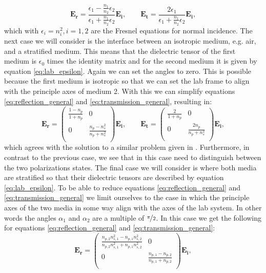 \begin{equation}
    \bm{E_r} = \frac{\epsilon_1-\frac{n_1}{n_2}\epsilon_2}{\epsilon_1+\frac{n_1}{n_2}\epsilon_2}\bm{E_i}, \qquad \bm{E_t} = \frac{2\epsilon_1}{\epsilon_1+\frac{n_1}{n_2}\epsilon_2}\bm{E_i},
\end{equation}
which with $\epsilon_i=n_i^2, i=1,2$ are the Fresnel equations for normal incidence. The next case we will consider is the interface between an isotropic medium, e.g. air, and a stratified medium. This means that the dielectric tensor of the first medium is $\epsilon_0$ times the identity matrix and for the second medium it is given by equation \ref{eq:lab_epsilon}. Again we can set the angles to zero. This is possible because the first medium is isotropic so that we can set the lab frame to align with the principle axes of medium 2. With this we can simplify equations \ref{eq:reflection_general} and \ref{eq:transmission_general}, resulting in:
\begin{equation}
    \bm{E_r} =
    \begin{pmatrix}
        \frac{1-n_p}{1+n_p} & 0 \\
        0 & \frac{n_p-n_s^2}{n_p+n_s^2} \\
    \end{pmatrix}
    \bm{E_i}, \qquad
    \bm{E_t} =
    \begin{pmatrix}
        \frac{2}{1+n_p} & 0 \\
        0 & \frac{2n_p}{n_p+n_s^2} \\
    \end{pmatrix}
    \bm{E_i},
\end{equation}
which agrees with the solution to a similar problem given in \cite{Lim1993ProblemsElectromagnetism}. Furthermore, in contrast to the previous case, we see that in this case need to distinguish between the two polarizations states. The final case we will consider is where both media are stratified so that their dielectric tensors are described by equation \ref{eq:lab_epsilon}. To be able to reduce equations \ref{eq:reflection_general} and \ref{eq:transmission_general} we limit ourselves to the case in which the principle axes of the two media in some way align with the axes of the lab system. In other words the angles $\alpha_1$ and $\alpha_2$ are a multiple of $\nicefrac{\pi}{2}$. In this case we get the following for equations \ref{eq:reflection_general} and \ref{eq:transmission_general}:
\begin{equation}
    \bm{E_r} =
    \begin{pmatrix}
        \frac{n_{p,2}n_{s,1}^2-n_{p,1}n_{s,2}^2}{n_{p,2}n_{s,1}^2+n_{p,1}n_{s,2}^2} & 0 \\
        0 & \frac{n_{p,1}-n_{p,2}}{n_{p,1}+n_{p,2}} \\
    \end{pmatrix}
    \bm{E_i},
\end{equation}
